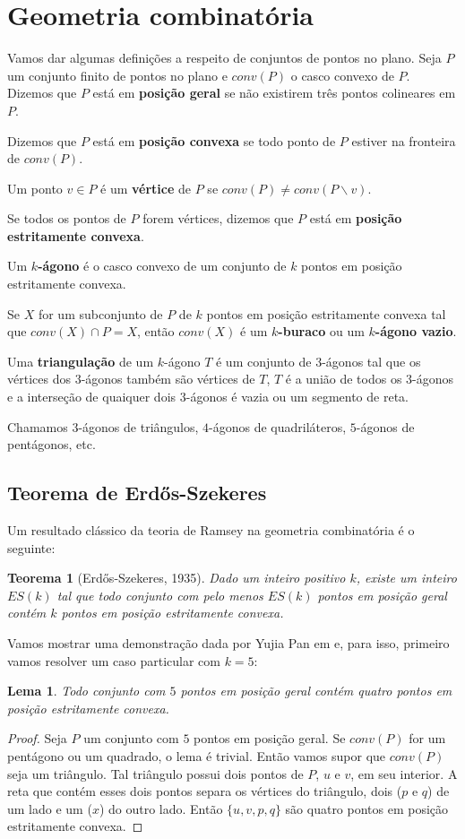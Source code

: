 \documentclass[a4paper]{book}
\newtheorem{lema}{Lema}
\newtheorem{teorema}{Teorema}
\begin{document}
\section{Geometria combinatória}
Vamos dar algumas definições a respeito de conjuntos de pontos no plano. Seja $P$ um conjunto finito de pontos no plano e $conv(P)$ o casco convexo de $P$. Dizemos que $P$ está em \textbf{posição geral} se não existirem três pontos colineares em $P$. 

Dizemos que $P$ está em \textbf{posição convexa} se todo ponto de $P$ estiver na fronteira de $conv(P)$.

Um ponto $v\in P$ é um \textbf{vértice} de $P$ se $conv(P)\neq conv(P\backslash v)$.

Se todos os pontos de $P$ forem vértices, dizemos que $P$ está em \textbf{posição estritamente convexa}.

Um \textbf{$k$-ágono} é o casco convexo de um conjunto de $k$ pontos em posição estritamente convexa.

Se $X$ for um subconjunto de $P$ de $k$ pontos em posição estritamente convexa tal que $conv(X)\cap P=X$, então  $conv(X)$ é um \textbf{$k$-buraco} ou um \textbf{$k$-ágono vazio}.

Uma \textbf{triangulação} de um $k$-ágono $T$ é um conjunto de $3$-ágonos tal que os vértices dos $3$-ágonos também são vértices de $T$, $T$ é a união de todos os $3$-ágonos e a interseção de quaiquer dois $3$-ágonos é vazia ou um segmento de reta.

Chamamos $3$-ágonos de triângulos, $4$-ágonos de quadriláteros, $5$-ágonos de pentágonos, etc.

\subsection{Teorema de Erd\H os-Szekeres}
Um resultado clássico da teoria de Ramsey na geometria combinatória é o seguinte:
\begin{teorema}[Erd\H os-Szekeres, 1935]
    Dado um inteiro positivo $k$, existe um inteiro $ES(k)$ tal que todo conjunto com pelo menos $ES(k)$ pontos em posição geral contém $k$ pontos em posição estritamente convexa.
\end{teorema}

Vamos mostrar uma demonstração dada por Yujia Pan em \cite{ES} e, para isso, primeiro vamos resolver um caso particular com $k=5$:
\begin{lema}
    Todo conjunto com $5$ pontos em posição geral contém quatro pontos em posição estritamente convexa.
\end{lema}
\begin{proof}
    Seja $P$ um conjunto com $5$ pontos em posição geral. Se $conv(P)$ for um pentágono ou um quadrado, o lema é trivial.
    Então vamos supor que $conv(P)$ seja um triângulo. Tal triângulo possui dois pontos de $P$, $u$ e $v$, em seu interior. A reta que contém esses dois pontos separa os vértices do triângulo, dois ($p$ e $q$) de um lado e um ($x$) do outro lado. Então $\{u,v,p,q\}$ são quatro pontos em posição estritamente convexa.
\end{proof}
\end{document}
